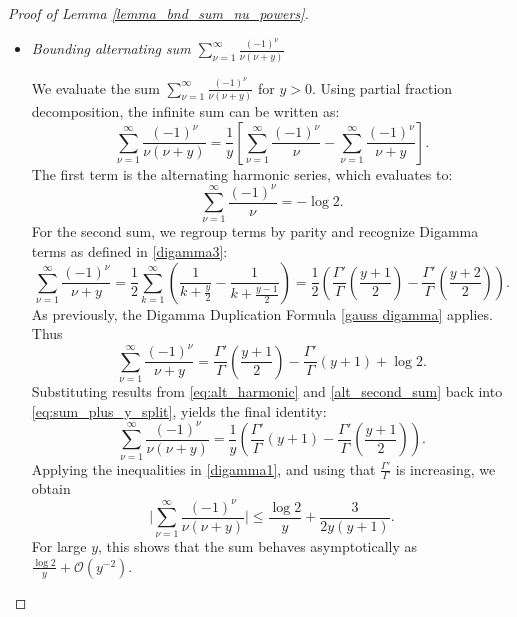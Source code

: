 \documentclass[11pt,letterpaper,oneside,reqno]{amsart}
\renewcommand{\^}[1]{\widehat{#1}}
\numberwithin{equation}{section}
\theoremstyle{remark}
\begin{document}
\begin{proof}[Proof of Lemma \ref{lemma_bnd_sum_nu_powers}]
\begin{itemize}
\item{\it Bounding alternating sum  $\sum_{\nu=1}^\infty \frac{(-1)^\nu}{\nu(\nu+y)}$}  

We evaluate the sum $\sum_{\nu=1}^{\infty} \frac{(-1)^\nu}{\nu(\nu+y)}$ for $y > 0$. Using partial fraction decomposition, 
the infinite sum can be written as:
\begin{equation}
\label{eq:sum_plus_y_split}
\sum_{\nu=1}^{\infty} \frac{(-1)^\nu}{\nu(\nu+y)} = \frac{1}{y} \left[ \sum_{\nu=1}^{\infty} \frac{(-1)^\nu}{\nu} - \sum_{\nu=1}^{\infty} \frac{(-1)^\nu}{\nu+y} \right].
\end{equation}
The first term is the alternating harmonic series, which evaluates to:
\begin{equation}
\label{eq:alt_harmonic}
\sum_{\nu=1}^{\infty} \frac{(-1)^\nu}{\nu} = -\log 2.
\end{equation}
%
For the second sum, we regroup terms by parity and recognize Digamma terms as defined in \eqref{digamma3}:
\begin{equation}
\sum_{\nu=1}^{\infty} \frac{(-1)^\nu}{\nu+y} 
= \frac{1}{2} \sum_{k=1}^{\infty} \left( \frac{1}{k+\frac{y}{2}} - \frac{1}{k+\frac{y-1}{2}} \right)
= \frac{1}{2} \left( \frac{\Gamma'}{\Gamma}\left( \frac{y+1}{2} \right) - \frac{\Gamma'}{\Gamma}\left( \frac{y+2}{2} \right) \right).
\end{equation}
As previously, the Digamma Duplication Formula \eqref{gauss digamma} applies.  %
Thus
\begin{equation}
\sum_{\nu=1}^{\infty} \frac{(-1)^\nu}{\nu+y} = \frac{\Gamma'}{\Gamma}\left( \frac{y+1}{2} \right) - \frac{\Gamma'}{\Gamma}(y+1) + \log 2. \label{alt_second_sum}
\end{equation}
Substituting results from \eqref{eq:alt_harmonic} and \eqref{alt_second_sum} back into \eqref{eq:sum_plus_y_split}, yields the final identity:
\begin{equation}
\sum_{\nu=1}^{\infty} \frac{(-1)^\nu}{\nu(\nu+y)} = \frac{1}{y} \left( \frac{\Gamma'}{\Gamma}(y+1) - \frac{\Gamma'}{\Gamma}\left( \frac{y+1}{2} \right) \right).
\end{equation}
%
Applying the inequalities in \eqref{digamma1}, %
and using that $\frac{\Gamma'}{\Gamma}$ is increasing, we obtain
\begin{equation}
\label{eq:log_bound_plus_y}
\bigg| \sum_{\nu=1}^{\infty} \frac{(-1)^\nu}{\nu(\nu+y)}\bigg|  \leq \frac{\log 2}{y} + \frac{3}{2y(y+1)}.
\end{equation}
For large $y$, this shows that the sum behaves asymptotically as $\frac{\log 2}{y} + \mathcal{O}(y^{-2})$.
\end{itemize}
\end{proof}
%
%
\end{document}
